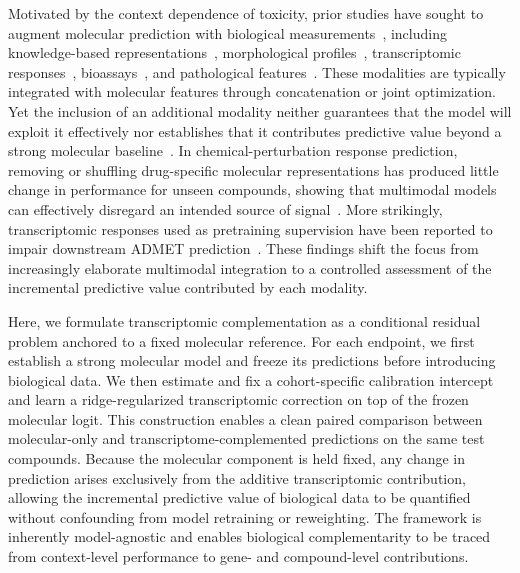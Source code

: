 \documentclass[11pt,a4paper]{article}
\begin{document}
Motivated by the context dependence of toxicity, prior studies have sought to augment molecular prediction with biological measurements~\cite{liu2023chemicalbiological}, including knowledge-based representations~\cite{park2025cotox}, morphological profiles~\cite{sanchezfernandez2023cloome}, transcriptomic responses~\cite{cattebeke2026integrating}, bioassays~\cite{zhang2025genotoxnet}, and pathological features~\cite{zhong2025hepatotoxicity}. These modalities are typically integrated with molecular features through concatenation or joint optimization. Yet the inclusion of an additional modality neither guarantees that the model will exploit it effectively nor establishes that it contributes predictive value beyond a strong molecular baseline~\cite{hessel2020multimodal}. In chemical-perturbation response prediction, removing or shuffling drug-specific molecular representations has produced little change in performance for unseen compounds, showing that multimodal models can effectively disregard an intended source of signal~\cite{bai2026perturbation}. More strikingly, transcriptomic responses used as pretraining supervision have been reported to impair downstream ADMET prediction~\cite{sypetkowski2024molgps}. These findings shift the focus from increasingly elaborate multimodal integration to a controlled assessment of the incremental predictive value contributed by each modality.

Here, we formulate transcriptomic complementation as a conditional residual problem anchored to a fixed molecular reference. For each endpoint, we first establish a strong molecular model and freeze its predictions before introducing biological data. We then estimate and fix a cohort-specific calibration intercept and learn a ridge-regularized transcriptomic correction on top of the frozen molecular logit. This construction enables a clean paired comparison between molecular-only and transcriptome-complemented predictions on the same test compounds. Because the molecular component is held fixed, any change in prediction arises exclusively from the additive transcriptomic contribution, allowing the incremental predictive value of biological data to be quantified without confounding from model retraining or reweighting. The framework is inherently model-agnostic and enables biological complementarity to be traced from context-level performance to gene- and compound-level contributions.
\end{document}
